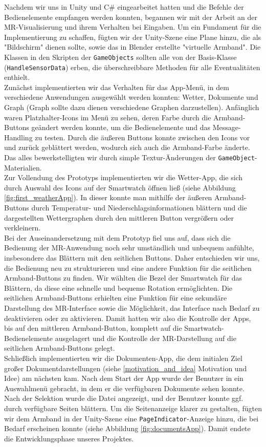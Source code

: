 \documentclass[11pt, a4paper]{article}
\begin{document}
Nachdem wir uns in Unity und C# eingearbeitet hatten und die Befehle der Bedienelemente empfangen werden konnten, begannen wir mit der Arbeit an der MR-Visualisierung und ihrem Verhalten bei Eingaben. Um ein Fundament für die Implementierung zu schaffen, fügten wir der Unity-Szene eine Plane hinzu, die als "Bildschirm" dienen sollte, sowie das in Blender erstellte "virtuelle Armband". Die Klassen in den Skripten der \texttt{GameObjects} sollten alle von der Basis-Klasse (\texttt{HandleSensorData}) erben, die überschreibbare Methoden für alle Eventualitäten enthielt.\\
Zunächst implementierten wir das Verhalten für das App-Menü, in dem verschiedene Anwendungen ausgewählt werden konnten: Wetter, Dokumente und Graph (Graph sollte dazu dienen verschiedene Graphen darzustellen). Anfänglich waren Platzhalter-Icons im Menü zu sehen, deren Farbe durch die Armband-Buttons geändert werden konnte, um die Bedienelemente und das Message-Handling zu testen. Durch die äußeren Buttons konnte zwischen den Icons vor und zurück geblättert werden, wodurch sich auch die Armband-Farbe änderte. Das alles bewerkstelligten wir durch simple Textur-Änderungen der \texttt{GameObject}-Materialien.\\
Zur Vollendung des Prototyps implementierten wir die Wetter-App, die sich durch Auswahl des Icons auf der Smartwatch öffnen ließ (siehe Abbildung \ref{fig:first_weatherApp}). In dieser konnte man mithilfe der äußeren Armband-Buttons durch Temperatur- und Niederschlagsinformationen blättern und die dargestellten Wettergraphen durch den mittleren Button vergrößern oder verkleinern.\\
Bei der Auseinandersetzung mit dem Prototyp fiel uns auf, dass sich die Bedienung der MR-Anwendung noch sehr umständlich und unbequem anfühlte, insbesondere das Blättern mit den seitlichen Buttons. Daher entschieden wir uns, die Bedienung neu zu strukturieren und eine andere Funktion für die seitlichen Armband-Buttons zu finden. Wir wählten die Bezel der Smartwatch für das Blättern, da diese eine schnelle und bequeme Rotation ermöglichten. Die seitlichen Armband-Buttons erhielten eine Funktion für eine sekundäre Darstellung des MR-Interface sowie die Möglichkeit, das Interface nach Bedarf zu deaktivieren oder zu aktivieren. Damit hatten wir also die Kontrolle der Apps, bis auf den mittleren Armband-Button, komplett auf die Smartwatch-Bedienelemente ausgelagert und die Kontrolle der MR-Darstellung auf die seitlichen Armband-Buttons gelegt.\\
Schließlich implementierten wir die Dokumenten-App, die dem initialen Ziel großer Dokumentdarstellungen (siehe \ref{motivation_and_idea} Motivation und Idee) am nächsten kam. Nach dem Start der App wurde der Benutzer in ein Auswahlmenü gebracht, in dem er die verfügbaren Dokumente sehen konnte. Nach der Selektion wurde die Datei angezeigt, und der Benutzer konnte ggf. durch verfügbare Seiten blättern. Um die Seitenanzeige klarer zu gestalten, fügten wir dem Armband in der Unity-Szene eine \texttt{PageIndicator}-Anzeige hinzu, die bei Bedarf erscheinen konnte (siehe Abbildung \ref{fig:documentsApp}). Damit endete die Entwicklungsphase unseres Projektes.
\end{document}

